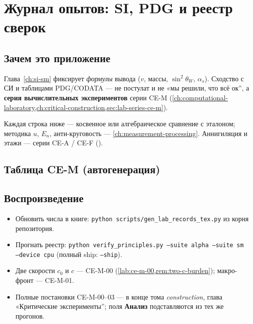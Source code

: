 \chapter{Журнал опытов: SI, PDG и реестр сверок}
\label{app:si-pdg-experiments}

\section{Зачем это приложение}
\label{sec:si-pdg-experiments}

Глава~\ref{ch:si-sm} фиксирует \emph{формулы} вывода ($v$, массы, $\sin^2\theta_W$, $\alpha_s$).
Сходство с СИ и таблицами PDG/CODATA --- не постулат и не «мы решили, что всё ок'',
а \textbf{серия вычислительных экспериментов} серии CE-M
(\cref{ch:computational-laboratory,ch:critical-construction,sec:lab-series-ce-m}).

Каждая строка ниже --- косвенное или алгебраическое сравнение с эталоном;
методика $u$, $E_n$, анти-круговость --- \cref{ch:measurement-processing}.
Аннигиляция и этажи --- серии CE-A / CE-F ().

\section{Таблица CE-M (автогенерация)}
\label{sec:si-pdg-table}



\section{Воспроизведение}
\begin{itemize}
  \item Обновить числа в книге:
    \texttt{python scripts/gen\_lab\_records\_tex.py} из корня репозитория.
  \item Прогнать реестр:
    \texttt{python verify\_principles.py --suite alpha --suite sm --device cpu}
    (полный ship: \texttt{--ship}).
  \item Две скорости $c_0$ и $c$ --- CE-M-00 (\cref{lab:ce-m-00,rem:two-c-burden}); макро-фронт --- CE-M-01.
  \item Полные постановки CE-M-00--03 --- в конце тома \emph{construction},
    глава «Критические эксперименты''; поля \textbf{Анализ} подставляются из тех же прогонов.
\end{itemize}
